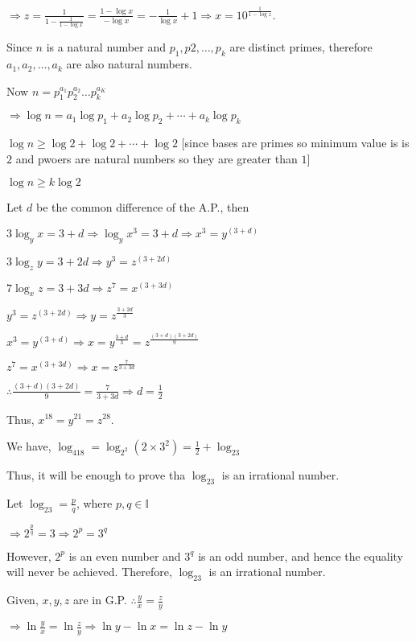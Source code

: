   $\Rightarrow z = \frac{1}{1 - \frac{1}{1 - \log x}} = \frac{1 - \log x}{-\log x} = -\frac{1}{\log x} + 1\Rightarrow x = 10^{\frac{1}{1 - \log z}}$.
\item Since $n$ is a natural number and $p_1, p2, \ldots, p_k$ are distinct primes, therefore $a_1, a_2, \ldots, a_k$ are also natural
  numbers.

  Now $n = p_1^{a_1}p_2^{a_2}\ldots p_k^{a_K}$

  $\Rightarrow \log n = a_1\log p_1 + a_2\log p_2 + \cdots + a_k\log p_k$

  $\log n\geq \log 2 + \log 2 + \cdots + \log 2$ [since bases are primes so minimum value is is $2$ and pwoers are natural
    numbers so they are greater than $1$]

  $\log n \geq k\log 2$
\item Let $d$ be the common difference of the A.P., then

  $3\log_yx = 3 + d \Rightarrow \log_yx^3 = 3 + d \Rightarrow x^3 = y^{(3 +d)}$

  $3\log_zy = 3 + 2d \Rightarrow y^3 = z^{(3 + 2d)}$

  $7\log_xz = 3 + 3d \Rightarrow z^7 = x^{(3 + 3d)}$

  $y^3 = z^{(3 + 2d)}\Rightarrow y = z^{\tfrac{3 + 2d}{3}}$

  $x^3 = y^{(3 + d)}\Rightarrow x = y^{\tfrac{3 + d}{3}} = z^{\tfrac{(3 + d)(3 + 2d)}{9}}$

  $z^7 = x^{(3 + 3d)}\Rightarrow x = z^{\tfrac{7}{3 + 3d}}$

  $\therefore \frac{(3 + d)(3 + 2d)}{9} = \frac{7}{3 + 3d}\Rightarrow d = \frac{1}{2}$

  Thus, $x^{18} = y^{21} = z^{28}$.
\item We have, $\log_418 = \log_{2^2}(2\times3^2) = \frac{1}{2} + \log_23$

  Thus, it will be enough to prove tha $\log_23$ is an irrational number.

  Let $\log_23 = \frac{p}{q}$, where $p, q\in\mathbb{I}$

  $\Rightarrow 2^{\tfrac{p}{q}} = 3 \Rightarrow 2^p = 3^q$

  However, $2^p$ is an even number and $3^q$ is an odd number, and hence the equality will never be achieved.
  Therefore, $\log_23$ is an irrational number.
\item Given, $x, y, z$ are in G.P. $\therefore \frac{y}{x} = \frac{z}{y}$

  $\Rightarrow \ln\frac{y}{x} = \ln\frac{z}{y}\Rightarrow \ln y - \ln x = \ln z - \ln y$


